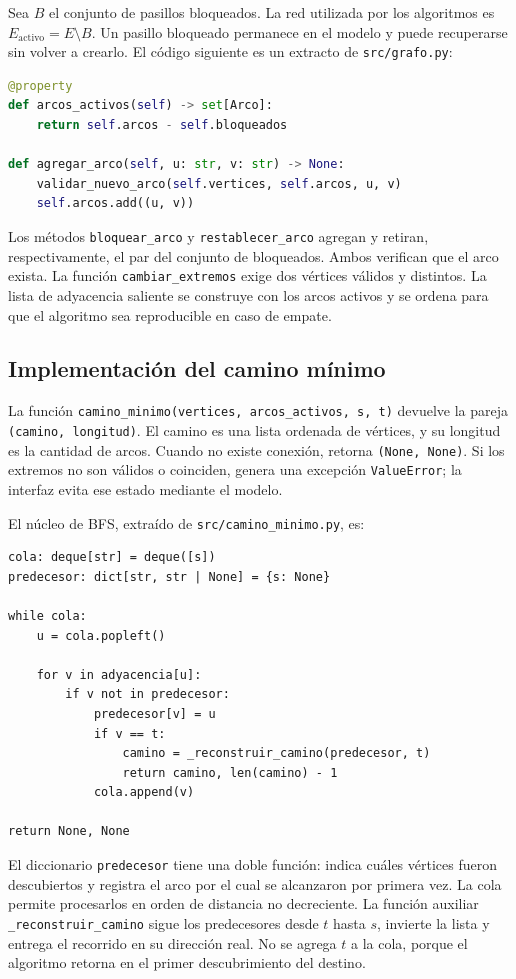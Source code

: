 \documentclass[11pt,a4paper]{article}
\begin{document}
Sea $B$ el conjunto de pasillos bloqueados. La red utilizada por los algoritmos es $E_{\mathrm{activo}}=E\setminus B$. Un pasillo bloqueado permanece en el modelo y puede recuperarse sin volver a crearlo. El código siguiente es un extracto de \texttt{src/grafo.py}:
\begin{lstlisting}[language=Python]
@property
def arcos_activos(self) -> set[Arco]:
    return self.arcos - self.bloqueados

def agregar_arco(self, u: str, v: str) -> None:
    validar_nuevo_arco(self.vertices, self.arcos, u, v)
    self.arcos.add((u, v))
\end{lstlisting}
Los métodos \texttt{bloquear\_arco} y \texttt{restablecer\_arco} agregan y retiran, respectivamente, el par del conjunto de bloqueados. Ambos verifican que el arco exista. La función \texttt{cambiar\_extremos} exige dos vértices válidos y distintos. La lista de adyacencia saliente se construye con los arcos activos y se ordena para que el algoritmo sea reproducible en caso de empate.

\subsection{Implementación del camino mínimo}
La función \texttt{camino\_minimo(vertices, arcos\_activos, s, t)} devuelve la pareja \texttt{(camino, longitud)}. El camino es una lista ordenada de vértices, y su longitud es la cantidad de arcos. Cuando no existe conexión, retorna \texttt{(None, None)}. Si los extremos no son válidos o coinciden, genera una excepción \texttt{ValueError}; la interfaz evita ese estado mediante el modelo.

El núcleo de BFS, extraído de \texttt{src/camino\_minimo.py}, es:
\begin{lstlisting}
cola: deque[str] = deque([s])
predecesor: dict[str, str | None] = {s: None}

while cola:
    u = cola.popleft()

    for v in adyacencia[u]:
        if v not in predecesor:
            predecesor[v] = u
            if v == t:
                camino = _reconstruir_camino(predecesor, t)
                return camino, len(camino) - 1
            cola.append(v)

return None, None
\end{lstlisting}
El diccionario \texttt{predecesor} tiene una doble función: indica cuáles vértices fueron descubiertos y registra el arco por el cual se alcanzaron por primera vez. La cola permite procesarlos en orden de distancia no decreciente. La función auxiliar \texttt{\_reconstruir\_camino} sigue los predecesores desde $t$ hasta $s$, invierte la lista y entrega el recorrido en su dirección real. No se agrega $t$ a la cola, porque el algoritmo retorna en el primer descubrimiento del destino.
\end{document}
